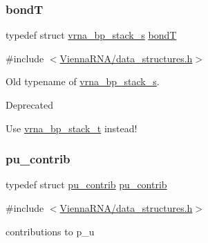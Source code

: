 \subsubsection{\texorpdfstring{bondT}{bondT}}
{\footnotesize\ttfamily typedef struct \mbox{\hyperlink{group__data__structures_structvrna__bp__stack__s}{vrna\+\_\+bp\+\_\+stack\+\_\+s}} \mbox{\hyperlink{group__data__structures_gaaeed53a7508c6ce549a98223e94b25df}{bondT}}}



{\ttfamily \#include $<$\mbox{\hyperlink{data__structures_8h}{Vienna\+R\+N\+A/data\+\_\+structures.\+h}}$>$}



Old typename of \mbox{\hyperlink{group__data__structures_structvrna__bp__stack__s}{vrna\+\_\+bp\+\_\+stack\+\_\+s}}. 

\begin{DoxyRefDesc}{Deprecated}
\item[\mbox{\hyperlink{deprecated__deprecated000051}{Deprecated}}]Use \mbox{\hyperlink{group__data__structures_gaa651bda42e7692f08cb603cd6834b0ee}{vrna\+\_\+bp\+\_\+stack\+\_\+t}} instead! \end{DoxyRefDesc}
\mbox{\label{group__data__structures_ga20881ac02e5932356c09b070efedb560}} 
\subsubsection{\texorpdfstring{pu\+\_\+contrib}{pu\_contrib}}
{\footnotesize\ttfamily typedef struct \mbox{\hyperlink{group__data__structures_structpu__contrib}{pu\+\_\+contrib}}  \mbox{\hyperlink{group__data__structures_structpu__contrib}{pu\+\_\+contrib}}}



{\ttfamily \#include $<$\mbox{\hyperlink{data__structures_8h}{Vienna\+R\+N\+A/data\+\_\+structures.\+h}}$>$}



contributions to p\+\_\+u 

\mbox{\label{group__data__structures_ga5a052dbe39d3ca1b13932934b13f5263}} 
